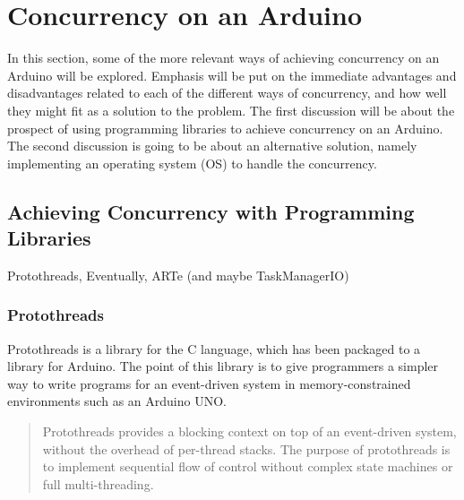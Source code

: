 \section{Concurrency on an Arduino}\label{sec:concurrencyinarduino}
In this section, some of the more relevant ways of achieving concurrency on an Arduino will be explored. Emphasis will be put on the immediate advantages and disadvantages related to each of the different ways of concurrency, and how well they might fit as a solution to the problem. The first discussion will be about the prospect of using programming libraries to achieve concurrency on an Arduino. The second discussion is going to be about an alternative solution, namely implementing an operating system (OS) to handle the concurrency.


\subsection{Achieving Concurrency with Programming Libraries}
Protothreads, Eventually, ARTe (and maybe TaskManagerIO)


\subsubsection{Protothreads}
Protothreads is a library for the C language, which has been packaged to a library for Arduino. The point of this library is to give programmers a simpler way to write programs for an event-driven system in memory-constrained environments such as an Arduino UNO.

\blockcquote{Artin2020}{Protothreads provides a blocking context on top of an event-driven system, without the overhead of per-thread stacks. The purpose of protothreads is to implement sequential flow of control without complex state machines or full multi-threading.}

